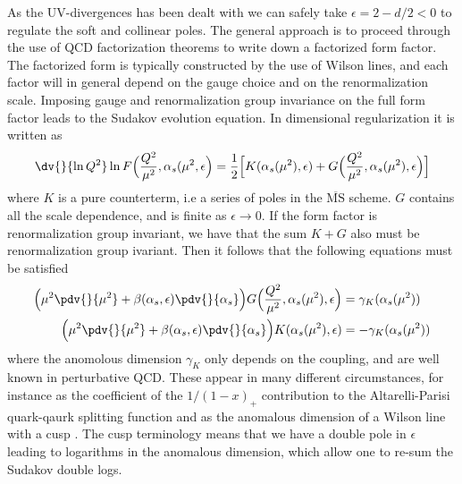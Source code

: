 As the UV-divergences has been dealt with we can safely take $\epsilon=2-d/2<0$ to regulate the soft and collinear poles. The general approach is to proceed through the use of QCD factorization theorems to write down a factorized form factor. The factorized form is typically constructed by the use of Wilson lines, and each factor will in general depend on the gauge choice and on the renormalization scale. Imposing gauge and renormalization group invariance on the full form factor leads to the Sudakov evolution equation. In dimensional regularization it is written as \cite{Collins:1989bt,PhysRevD.24.3281}
\begin{align}
    \dv{}{\ln Q^{2}}\ln F\Big(\frac{Q^{2}}{\mu^{2}},\alpha_{s}(\mu^{2},\epsilon\Big)=\frac{1}{2}\Big[K(\alpha_{s}(\mu^{2}),\epsilon)+G\Big(\frac{Q^{2}}{\mu^{2}},\alpha_{s}(\mu^{2}),\epsilon\Big)\Big]
\end{align}
where $K$ is a pure counterterm, i.e a series of poles in the $\overline{\text{MS}}$ scheme. $G$ contains all the scale dependence, and is finite as $\epsilon\rightarrow 0$. If the form factor is renormalization group invariant, we have that the sum $K+G$ also must be renormalization group ivariant. Then it follows that the following equations must be satisfied
\begin{align}\label{eq:anomalous dimension equation}
    \Big(\mu^{2}\pdv{}{\mu^{2}}+\beta(\alpha_s,\epsilon)\pdv{}{\alpha_s}\Big)G\Big(\frac{Q^{2}}{\mu^{2}},\alpha_{s}(\mu^{2}),\epsilon\Big)&=\gamma_{K}(\alpha_{s}(\mu^{2}))
    \\
    \Big(\mu^{2}\pdv{}{\mu^{2}}+\beta(\alpha_s,\epsilon)\pdv{}{\alpha_s}\Big)K(\alpha_{s}(\mu^{2}),\epsilon)&=-\gamma_{K}(\alpha_{s}(\mu^{2}))
\end{align}
where the anomolous dimension $\gamma_{K}$ only depends on the coupling, and are well known in perturbative QCD. These appear in many different circumstances, for instance as the coefficient of the $1/(1-x)_{+}$ contribution to the Altarelli-Parisi quark-qaurk splitting function and as the anomalous dimension of a Wilson line with a cusp \cite{Korchemsky:1987wg}. The cusp terminology means that we have a double pole in $\epsilon$ leading to logarithms in the anomalous dimension, which allow one to re-sum the Sudakov double logs. 

